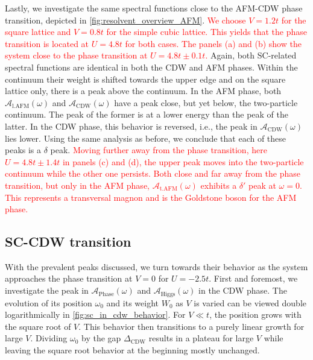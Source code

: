 \documentclass[
    reprint, 
    aps,
    preprintnumbers,
    twocolumn,
    prb,
    superscriptaddress
]{revtex4-2}
\newcommand{\spectral}[1]{\mathcal{A}_\text{#1}  (\omega)}
\begin{document}
Lastly, we investigate the same spectral functions close to the AFM-CDW phase transition, depicted in \autoref{fig:resolvent_overview_AFM}.
\textcolor{red}{We choose $V=1.2t$ for the square lattice and $V=0.8t$ for the simple cubic lattice.
This yields that the phase transition is located at $U=4.8t$ for both cases. 
The panels (a) and (b) show the system close to the phase transition at $U=4.8t \pm 0.1t$.}
Again, both SC-related spectral functions are identical in both the CDW and AFM phases.
Within the continuum their weight is shifted towards the upper edge and on the square lattice only, there is a peak above the continuum.
In the AFM phase, both $\spectral{l.AFM}$ and $\spectral{CDW}$ have a peak close, but yet below, the two-particle continuum.
The peak of the former is at a lower energy than the peak of the latter.
In the CDW phase, this behavior is reversed, i.e., the peak in $\spectral{CDW}$ lies lower.
Using the same analysis as before, we conclude that each of these peaks is a $\delta$ peak.
\textcolor{red}{Moving further away from the phase transition, here $U=4.8t \pm 1.4t$ in panels (c) and (d), the upper peak moves into the two-particle continuum while the other one persists.
Both close and far away from the phase transition, but only in the AFM phase, $\spectral{t.AFM}$ exhibits a $\delta'$ peak at $\omega=0$.
This represents a transversal magnon and is the Goldstone boson for the AFM phase.}



\subsection{SC-CDW transition}

With the prevalent peaks discussed, we turn towards their behavior as the system approaches the phase transition at $V=0$ for $U=-2.5t$.
First and foremost, we investigate the peak in $\spectral{Phase}$ and $\spectral{Higgs}$ in the CDW phase.
The evolution of its position $\omega_0$ and its weight $W_0$ as $V$ is varied can be viewed double logarithmically in \autoref{fig:sc_in_cdw_behavior}.
For $V \ll t$, the position grows with the square root of $V$. This behavior then transitions to a purely linear growth for large $V$.
Dividing $\omega_0$ by the gap $\Delta_\text{CDW}$ results in a plateau for large $V$ while leaving the square root behavior at the beginning mostly unchanged.
\end{document}
